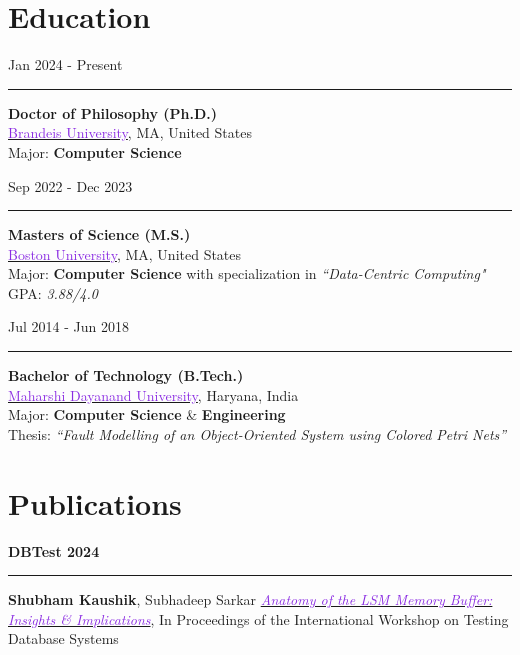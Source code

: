 \documentclass[10pt,a4paper,calibri]{moderncv}
\newcommand{\mediumspace}{\vspace{0.6em}}
\newcommand{\education}[2]{
  \noindent
  \begin{minipage}[c]{0.20\textwidth}
    \hfill
    #1
  \end{minipage}%
  \hspace{0.01\textwidth}
  \begin{minipage}[c]{0.02\textwidth}
    \textcolor{lightgray}{\rule{1pt}{1.6cm}}
  \end{minipage}%
  \begin{minipage}[c]{0.80\textwidth}
    \raggedright{
      #2
    }
  \end{minipage}%
}
\newcommand{\publications}[2]{
  \noindent
  \begin{minipage}[c]{0.15\textwidth}
    \centering
    \textbf{#1}
  \end{minipage}%
  \hspace{0.01\textwidth}
  \begin{minipage}[c]{0.02\textwidth}
    \textcolor{lightgray}{\rule{1pt}{0.75cm}}
  \end{minipage}%
  \begin{minipage}[c]{0.80\textwidth}
    \raggedright{
      #2
    }
  \end{minipage}%
}
\begin{document}
\section{Education}
\noindent
\begin{minipage}[c]{0.20\textwidth}
	\hfill
	Jan 2024 \-- Present
\end{minipage}%
\hspace{0.01\textwidth}
\begin{minipage}[c]{0.02\textwidth}
	\textcolor{lightgray}{\rule{1pt}{1.2cm}}
\end{minipage}%
\begin{minipage}[c]{0.80\textwidth}
	\raggedright{
		\textbf{Doctor of Philosophy (Ph.D.)}\\
		\href{https://www.brandeis.edu/}{\textcolor{blueviolet}{Brandeis University}}, MA, United States\\
		Major: \textbf{Computer Science}\\
	}
\end{minipage}%

\mediumspace

\education{Sep 2022 \-- Dec 2023}
{
	\textbf{Masters of Science (M.S.)}\\
	\href{https://www.bu.edu/}{\textcolor{blueviolet}{Boston University}}, MA, United States\\
	Major: \textbf{Computer Science} with specialization in \textit{“Data-Centric Computing"}\\
	GPA: \textit{3.88/4.0}
}

\mediumspace

\education{Jul 2014 \-- Jun 2018}
{
	\textbf{Bachelor of Technology (B.Tech.)}\\
	\href{https://mdu.ac.in/}{\textcolor{blueviolet}{Maharshi Dayanand University}}, Haryana, India\\
	Major: \textbf{Computer Science} \& \textbf{Engineering}\\
	Thesis: \textit{“Fault Modelling of an Object-Oriented System using Colored Petri Nets”}\\
}


\section{Publications}
\publications{DBTest 2024}{\textbf{Shubham Kaushik}, Subhadeep Sarkar \href{https://doi.org/10.1145/3662165.3662766}{\textit{\textcolor{blueviolet}{Anatomy
				of the LSM Memory Buffer: Insights \& Implications}}}, In Proceedings of the International Workshop on Testing Database Systems}
\end{document}
